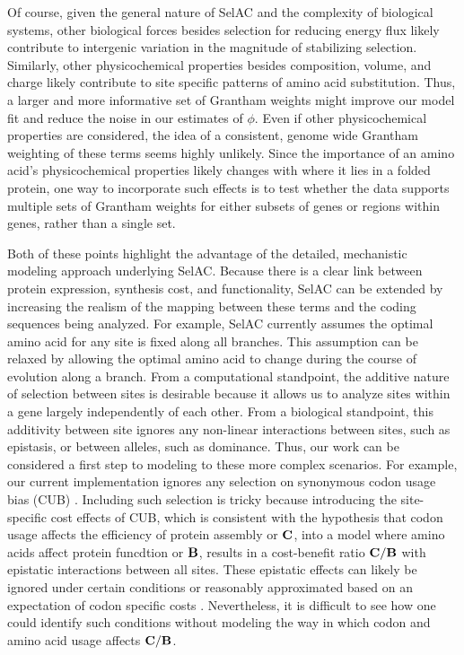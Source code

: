 \documentclass[12pt,letterpaper]{article}
\newcommand{\Cost}{\ensuremath{\text{\textbf{C}}}\xspace}
\newcommand{\Func}{\ensuremath{\text{\textbf{B}}}\xspace}
\newcommand{\selac}{SelAC\xspace}
\begin{document}
Of course, given the general nature of \selac and the complexity of biological systems, other biological forces besides selection for reducing energy flux likely contribute to intergenic variation in the magnitude of stabilizing selection. 
Similarly, other physicochemical properties besides composition, volume, and charge likely contribute to site specific patterns of amino acid substitution. 
Thus, a larger and more informative set of Grantham weights might improve our model fit and reduce the noise in our estimates of $\phi$. 
Even if other physicochemical properties are considered, the idea of a consistent, genome wide Grantham weighting of these terms seems highly unlikely. 
Since the importance of an amino acid's physicochemical properties likely changes with where it lies in a folded protein, one way to incorporate such effects is to test whether the data supports multiple sets of Grantham weights for either subsets of genes or regions within genes, rather than a single set.

Both of these points highlight the advantage of the detailed, mechanistic modeling approach underlying \selac. 
Because there is a clear link between protein expression, synthesis cost, and functionality, \selac can be extended by increasing the realism of the mapping between these terms and the coding sequences being analyzed. 
For example, \selac currently assumes the optimal amino acid for any site is fixed along all branches. 
This assumption can be relaxed by allowing the optimal amino acid to change during the course of evolution along a branch.
From a computational standpoint, the additive nature of selection between sites is desirable because it allows us to analyze sites within a gene largely independently of each other.
From a biological standpoint, this additivity between site ignores any non-linear interactions between sites, such as epistasis, or between alleles, such as dominance. 
Thus, our work can be considered a first step to modeling to these more complex scenarios. 
For example, our current implementation ignores any selection on synonymous codon usage bias (CUB) \citep[c.f.~][]{YangAndNielsen2008,PouyetEtAl2016}. 
Including such selection is tricky because introducing the site-specific cost effects of CUB, which is consistent with the hypothesis that codon usage affects the efficiency of protein assembly or \Cost, into a model where amino acids affect protein funcdtion or \Func, results in a cost-benefit ratio $\Cost/\Func$ with epistatic interactions between all sites. 
These epistatic effects can likely be ignored under certain conditions or reasonably approximated based on an expectation of codon specific costs \citep[e.g.~][]{KubatkoEtAl2016}. 
Nevertheless, it is difficult to see how one could identify such conditions without modeling the way in which codon and amino acid usage affects $\Cost/\Func$.
\end{document}
